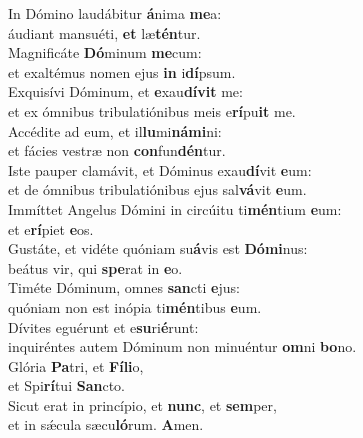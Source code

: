 \evenverse In Dómino laudábitur \textbf{á}nima \textbf{me}a:~\*\\
\evenverse áudiant mansuéti, \textbf{et} læ\textbf{tén}tur.\\
\oddverse Magnificáte \textbf{Dó}minum \textbf{me}cum:~\*\\
\oddverse et exaltémus nomen ejus \textbf{in} i\textbf{dí}psum.\\
\evenverse Exquisívi Dóminum, et \textbf{e}xau\textbf{dí}\textbf{vit} me:~\*\\
\evenverse et ex ómnibus tribulatiónibus meis e\textbf{rí}pu\textbf{it} me.\\
\oddverse Accédite ad eum, et il\textbf{lu}mi\textbf{ná}\textbf{mi}ni:~\*\\
\oddverse et fácies vestræ non \textbf{con}fun\textbf{dén}tur.\\
\evenverse Iste pauper clamávit, et Dóminus exau\textbf{dí}vit \textbf{e}um:~\*\\
\evenverse et de ómnibus tribulatiónibus ejus sal\textbf{vá}vit \textbf{e}um.\\
\oddverse Immíttet Angelus Dómini in circúitu ti\textbf{mén}tium \textbf{e}um:~\*\\
\oddverse et e\textbf{rí}piet \textbf{e}os.\\
\evenverse Gustáte, et vidéte quóniam su\textbf{á}vis est \textbf{Dó}\textbf{mi}nus:~\*\\
\evenverse beátus vir, qui \textbf{spe}rat in \textbf{e}o.\\
\oddverse Timéte Dóminum, omnes \textbf{san}cti \textbf{e}jus:~\*\\
\oddverse quóniam non est inópia ti\textbf{mén}tibus \textbf{e}um.\\
\evenverse Dívites eguérunt et e\textbf{su}ri\textbf{é}runt:~\*\\
\evenverse inquiréntes autem Dóminum non minuéntur \textbf{om}ni \textbf{bo}no.\\
\oddverse Glória \textbf{Pa}tri, et \textbf{Fí}\textbf{li}o,~\*\\
\oddverse et Spi\textbf{rí}tui \textbf{San}cto.\\
\evenverse Sicut erat in princípio, et \textbf{nunc}, et \textbf{sem}per,~\*\\
\evenverse et in sǽcula sæcu\textbf{ló}rum. \textbf{A}men.\\
